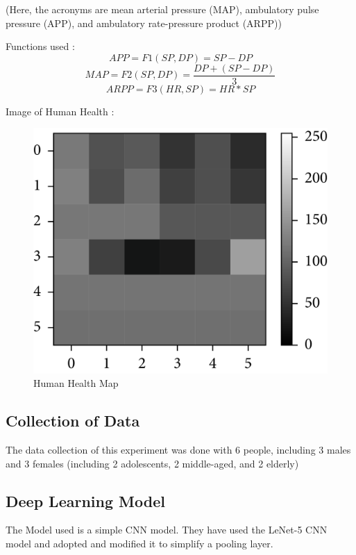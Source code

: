 \documentclass{article}
\begin{document}
(Here, the acronyms are mean arterial pressure (MAP), ambulatory pulse pressure (APP), and ambulatory rate-pressure product (ARPP))

Functions used :
\begin{equation}
    APP = F1(SP, DP) = SP - DP
\end{equation}
\begin{equation}
    MAP = F2(SP, DP) = \frac{DP + (SP - DP)}{3}
\end{equation}
\begin{equation}
    ARPP = F3(HR, SP) = HR * SP
\end{equation}

Image of Human Health : 
\begin{figure}
    \centering
    \includegraphics[width=\linewidth]{4109102.fig.003.png}
    \caption{Human Health Map}
    \label{fig:label2}
\end{figure}


\subsection{Collection of Data}
The data collection of this experiment was done with 6 people, including 3 males and 3 females (including 2 adolescents, 2 middle-aged, and 2 elderly)

\subsection{Deep Learning Model}
The Model used is a simple CNN model. They have used the LeNet-5 CNN model and adopted and modified it to simplify a pooling layer.
\end{document}
